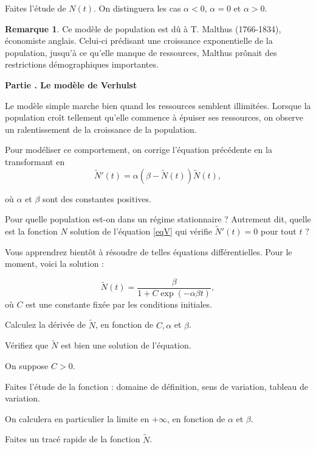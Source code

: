 \documentclass[11pt,a4paper]{amsart}
\theoremstyle{theorem}
\theoremstyle{definition}
\newtheorem{remarque}[thm]{Remarque}
\newcounter{NumPartie}
\newcounter{qcounter}
\newcommand{\partie}[1]{
\stepcounter{NumPartie}\setcounter{qcounter}{0}
\vspace{.3cm}
\begin{center}
\textbf{Partie \Roman{NumPartie}. #1}
\end{center}
}
\begin{document}
{Faites l'étude de $N(t)$. On distinguera les cas $\alpha<0$, $\alpha=0$ et $\alpha>0$.

\begin{remarque}
Ce modèle de population est dû à T. Malthus (1766-1834), économiste anglais. Celui-ci prédisant une croissance exponentielle de la population, jusqu'à ce qu'elle manque de ressources, Malthus prônait des restrictions démographiques importantes.
\end{remarque}


\partie{Le modèle de Verhulst}


Le modèle simple marche bien quand les ressources semblent illimitées. Lorsque la population croît tellement qu'elle commence à épuiser ses ressources, on observe un ralentissement de la croissance de la population. 

Pour modéliser ce comportement, on corrige l'équation précédente en la transformant en 
\begin{equation}\label{eqV}
\tilde{N}'(t) = \alpha (\beta - \tilde{N}(t) ) \tilde{N}(t),
\end{equation}

où $\alpha$ et $\beta$ sont des constantes positives.


\question Pour quelle population est-on dans un régime stationnaire ? Autrement dit, quelle est la fonction $N$ solution de l'équation  \ref{eqV} qui vérifie $\tilde{N}'(t) =0$ pour tout $t$ ?

Vous apprendrez bientôt à résoudre de telles équations différentielles. Pour le moment, voici la solution :
 
\begin{equation}
\tilde{N}(t)= \frac{\beta}{1+ C \exp(-\alpha\beta t)},
\end{equation}
où $C$ est une constante fixée par les conditions initiales. 


\question Calculez la dérivée de $\tilde N$, en fonction de $C,\alpha$ et $\beta$.

\question Vérifiez que $\tilde N$ est bien
 une solution de l'équation.

\question
On suppose $C>0$.

\squestion Faites l'étude de la fonction : domaine de définition, sens de variation, tableau de variation.

On calculera en particulier la limite en $+\infty$, en fonction de $\alpha$ et $\beta$. 

\squestion  Faites un tracé rapide de la fonction $\tilde N$.

}
\end{document}
